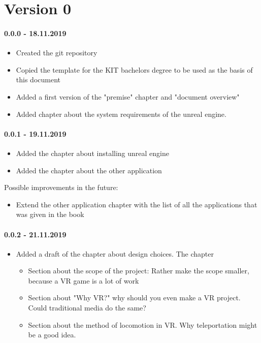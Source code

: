 
\section*{Version 0}

\paragraph{0.0.0 - 18.11.2019}

\begin{itemize}
\item Created the git repository
\item Copied the template for the KIT bachelors degree to be used as the basis of this document
\item Added a first version of the "premise" chapter and "document overview"
\item Added chapter about the system requirements of the unreal engine.
\end{itemize}

\paragraph{0.0.1 - 19.11.2019}

\begin{itemize}
\item Added the chapter about installing unreal engine
\item Added the chapter about the other application
\end{itemize}

Possible improvements in the future:

\begin{itemize}
\item Extend the other application chapter with the list of all the applications that was given in the book
\end{itemize}

\paragraph{0.0.2 - 21.11.2019} 

\begin{itemize}
\item Added a draft of the chapter about design choices. The chapter
\begin{itemize}
\item Section about the scope of the project: Rather make the scope smaller, because a VR game is a lot of work
\item Section about "Why VR?" why should you even make a VR project. Could traditional media do the same?
\item Section about the method of locomotion in VR. Why teleportation might be a good idea.
\end{itemize}
\end{itemize}